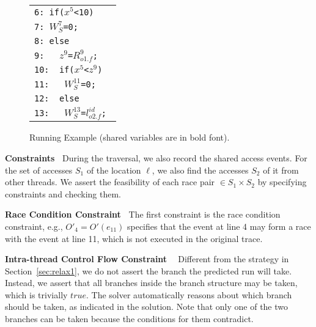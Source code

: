 \begin{figure}
\centering
\begin{tabular}{l}
 {\tt 6: if($x^5$<10)}  \\ %
{\tt 7: $W^7_{S}$=0;}   \\%
 {{\tt 8:  else}}   \\ %
 {{\tt 9: \ \ $z^9$=$R^{9}_{o1.f}$;}}  \\ %
 {{\tt 10: \ if($x^5$<$z^9$)}}  \\%
 {{\tt 11: \ \ $W^{11}_{S}$=0;}} \\%
 {{\tt 12: \ else }}  \\%
 {{\tt 13: \ \ $W^{13}_{S}$=$l^{id}_{o2.f}$; }}   \\%
\end{tabular}
\caption{Running Example (shared variables are in bold font). }
\label{fig:pathssa}
\end{figure}






{\bf Constraints\ } During the traversal, we also record the shared access events.  For the set of accesses $S_1$ of the location $\ell$, we also find the accesses $S_2$ of it from other threads. We assert the feasibility of each race pair $\in S_1 \times S_2$ by specifying constraints and checking them.

{\bf Race Condition Constraint\ }  The first constraint is the race condition constraint, e.g., $O'_{4}=O'(e_11)$ specifies that the event at line 4 may form a race with the event at line 11, which is not executed in the original trace.

{\bf Intra-thread Control Flow Constraint \ } Different from the strategy in Section~\ref{sec:relax1}, we do not assert the branch the predicted run will take. Instead, we assert that all branches inside the branch structure may be taken, which is trivially $true$. The solver automatically reasons about which branch should be taken, as indicated in the solution. Note that only one of the two branches can be taken because the conditions for them contradict.

